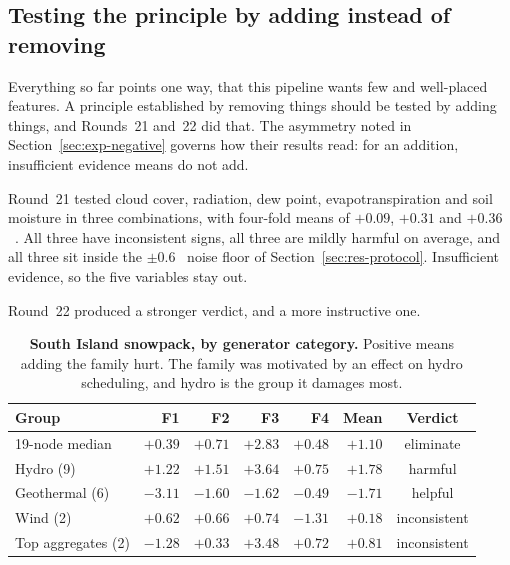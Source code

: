 \subsection{Testing the principle by adding instead of removing}
\label{sec:res-cov-neg}

Everything so far points one way, that this pipeline wants few and well-placed features.
A principle established by removing things should be tested by adding things, and
Rounds~21 and~22 did that. The asymmetry noted in Section~\ref{sec:exp-negative} governs
how their results read: for an addition, insufficient evidence means do not add.

Round~21 tested cloud cover, radiation, dew point, evapotranspiration and soil moisture in
three combinations, with four-fold means of $+0.09$, $+0.31$ and $+0.36$~\pp{}. All three
have inconsistent signs, all three are mildly harmful on average, and all three sit inside
the $\pm 0.6$~\pp{} noise floor of Section~\ref{sec:res-protocol}. Insufficient evidence,
so the five variables stay out.

Round~22 produced a stronger verdict, and a more instructive one.

\begin{table}[htp]
\centering
\begin{tabular}{lrrrrrc}
\toprule
{\bf Group} & {\bf F1} & {\bf F2} & {\bf F3} & {\bf F4} & {\bf Mean} & {\bf Verdict} \\
\midrule
19-node median & $+0.39$ & $+0.71$ & $+2.83$ & $+0.48$ & $+1.10$ & eliminate \\
Hydro (9) & $+1.22$ & $+1.51$ & $+3.64$ & $+0.75$ & $+1.78$ & harmful \\
Geothermal (6) & $-3.11$ & $-1.60$ & $-1.62$ & $-0.49$ & $-1.71$ & helpful \\
Wind (2) & $+0.62$ & $+0.66$ & $+0.74$ & $-1.31$ & $+0.18$ & inconsistent \\
Top aggregates (2) & $-1.28$ & $+0.33$ & $+3.48$ & $+0.72$ & $+0.81$ & inconsistent \\
\bottomrule
\end{tabular}
\caption[Snowpack by category]{\textbf{South Island snowpack, by generator category.}
Positive means adding the family hurt. The family was motivated by an effect on hydro
scheduling, and hydro is the group it damages most.}
\label{tab:snow}
\end{table}

